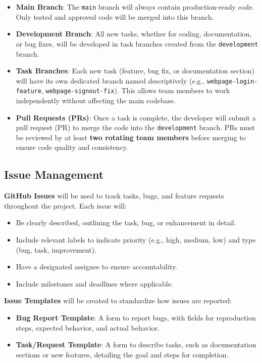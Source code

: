\documentclass{article}
\begin{document}
\begin{itemize}
    \item \textbf{Main Branch}: The \texttt{main} branch will always contain production-ready code. Only tested and approved code will be merged into this branch.
    \item \textbf{Development Branch}: All new tasks, whether for coding, documentation, or bug fixes, will be developed in task branches created from the \texttt{development} branch.
    \item \textbf{Task Branches}: Each new task (feature, bug fix, or documentation section) will have its own dedicated branch named descriptively (e.g., \texttt{webpage-login-feature}, \texttt{webpage-signout-fix}). This allows team members to work independently without affecting the main codebase.
    \item \textbf{Pull Requests (PRs)}: Once a task is complete, the developer will submit a pull request (PR) to merge the code into the \texttt{development} branch. PRs must be reviewed by at least \textbf{two rotating team members} before merging to ensure code quality and consistency.
\end{itemize}

\subsection{Issue Management}
\textbf{GitHub Issues} will be used to track tasks, bugs, and feature requests throughout the project. Each issue will:
\begin{itemize}
    \item Be clearly described, outlining the task, bug, or enhancement in detail.
    \item Include relevant labels to indicate priority (e.g., high, medium, low) and type (bug, task, improvement).
    \item Have a designated assignee to ensure accountability.
    \item Include milestones and deadlines where applicable.
\end{itemize}

\textbf{Issue Templates} will be created to standardize how issues are reported:
\begin{itemize}
    \item \textbf{Bug Report Template}: A form to report bugs, with fields for reproduction steps, expected behavior, and actual behavior.
    \item \textbf{Task/Request Template}: A form to describe tasks, such as documentation sections or new features, detailing the goal and steps for completion.
\end{itemize}
\end{document}
